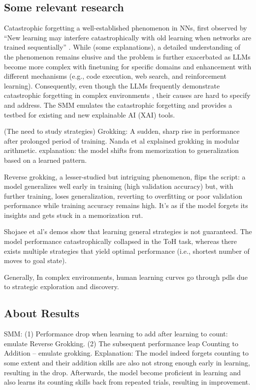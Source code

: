 \documentclass{article}
\begin{document}
\subsection*{Some relevant research}
Catastrophic forgetting a well-established phenomenon in NNs, first observed by \citet{mccloskey1989catastrophic}
``New learning may interfere catastrophically with old learning when networks are trained sequentially'' \citep[][pp. 109]{mccloskey1989catastrophic}. While (some explanations), a detailed understanding of the phenomenon remains elusive and the problem is further exacerbated as LLMs become more complex with finetuning for specific domains and enhancement with different mechanisms (e.g., code execution, web search, and reinforcement learning). Consequently, even though the LLMs frequently demonstrate catastrophic forgetting in complex environments \citep[][]{shojaee2025illusion, rahman2025llm}, their causes are hard to specify and address. The SMM emulates the catastrophic forgetting and provides a testbed for existing and new explainable AI (XAI) tools.

(The need to study strategies)
Grokking: A sudden, sharp rise in performance after prolonged period of training. Nanda et al explained grokking in modular arithmetic. explanation: the model shifts from memorization to generalization based on a learned pattern.

Reverse grokking, a lesser-studied but intriguing phenomenon, flips the script: a model generalizes well early in training (high validation accuracy) but, with further training, loses generalization, reverting to overfitting or poor validation performance while training accuracy remains high. It’s as if the model forgets its insights and gets stuck in a memorization rut.

Shojaee et al's demos show that learning general strategies is not guaranteed. The model performance catastrophically collapsed in the ToH task, whereas there exists multiple strategies that yield optimal performance (i.e., shortest number of moves to goal state).

Generally, In complex environments, human learning curves go through pdls due to strategic exploration and discovery. 


\subsection{About Results}
SMM: (1) Performance drop when learning to add after learning to count: emulate Reverse Grokking. (2) The subsequent performance leap Counting to Addition -- emulate grokking. Explanation: The model indeed forgets counting to some extent and their addition skills are also not strong enough early in learning, resulting in the drop. Afterwards, the model become proficient in learning and also learns its counting skills back from repeated trials, resulting in improvement.
\end{document}
